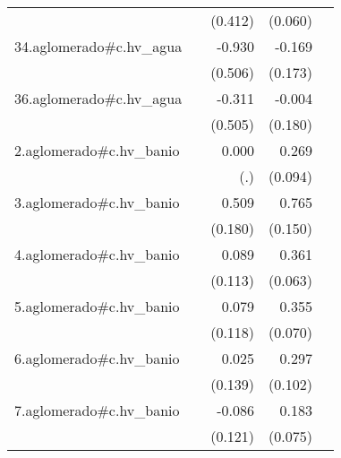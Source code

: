 {\begin{longtable}{l*{4}{D{.}{.}{-1}}}
            &                     &     (0.412)         &     (0.060)         &                     \\
\addlinespace
34.aglomerado#c.hv\_agua&                     &      -0.930         &      -0.169         &                     \\
            &                     &     (0.506)         &     (0.173)         &                     \\
\addlinespace
36.aglomerado#c.hv\_agua&                     &      -0.311         &      -0.004         &                     \\
            &                     &     (0.505)         &     (0.180)         &                     \\
\addlinespace
2.aglomerado#c.hv\_banio&                     &       0.000         &       0.269\sym{**} &                     \\
            &                     &         (.)         &     (0.094)         &                     \\
\addlinespace
3.aglomerado#c.hv\_banio&                     &       0.509\sym{**} &       0.765\sym{***}&                     \\
            &                     &     (0.180)         &     (0.150)         &                     \\
\addlinespace
4.aglomerado#c.hv\_banio&                     &       0.089         &       0.361\sym{***}&                     \\
            &                     &     (0.113)         &     (0.063)         &                     \\
\addlinespace
5.aglomerado#c.hv\_banio&                     &       0.079         &       0.355\sym{***}&                     \\
            &                     &     (0.118)         &     (0.070)         &                     \\
\addlinespace
6.aglomerado#c.hv\_banio&                     &       0.025         &       0.297\sym{**} &                     \\
            &                     &     (0.139)         &     (0.102)         &                     \\
\addlinespace
7.aglomerado#c.hv\_banio&                     &      -0.086         &       0.183\sym{*}  &                     \\
            &                     &     (0.121)         &     (0.075)         &                     \\

\end{longtable}}
